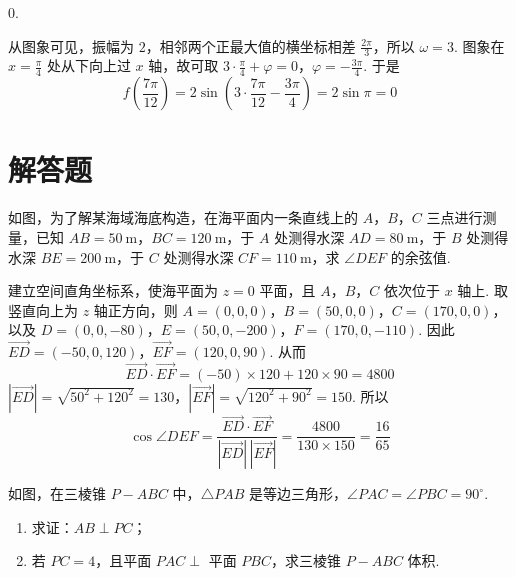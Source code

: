\begin{answer}
\(0\).
\end{answer}

\begin{solution}
从图象可见，振幅为 \(2\)，相邻两个正最大值的横坐标相差 \(\frac{2\pi}{3}\)，所以 \(\omega=3\). 图象在 \(x=\frac\pi4\) 处从下向上过 \(x\) 轴，故可取
\(3\cdot\frac\pi4+\varphi=0\)，\(\varphi=-\frac{3\pi}{4}\).
于是
\[
f\left(\frac{7\pi}{12}\right)
=2\sin\left(3\cdot\frac{7\pi}{12}-\frac{3\pi}{4}\right)
=2\sin\pi=0
\]
\end{solution}

\section{解答题}

\begin{problem}
如图，为了解某海域海底构造，在海平面内一条直线上的 \(A\)，\(B\)，\(C\) 三点进行测量，已知 \(AB = 50 \mathrm{~m}\)，\(BC = 120 \mathrm{~m}\)，于 \(A\) 处测得水深 \(AD = 80 \mathrm{~m}\)，于 \(B\) 处测得水深 \(BE = 200 \mathrm{~m}\)，于 \(C\) 处测得水深 \(CF = 110 \mathrm{~m}\)，求 \(\angle DEF\) 的余弦值.

\FloatBarrier
\end{problem}

\begin{solution}
建立空间直角坐标系，使海平面为 \(z=0\) 平面，且 \(A\)，\(B\)，\(C\) 依次位于 \(x\) 轴上. 取竖直向上为 \(z\) 轴正方向，则
\(A=(0,0,0)\)，\(B=(50,0,0)\)，\(C=(170,0,0)\)，
以及
\(D=(0,0,-80)\)，\(E=(50,0,-200)\)，\(F=(170,0,-110)\).
因此
\(\overrightarrow{ED}=(-50,0,120)\)，\(\overrightarrow{EF}=(120,0,90)\).
从而
\[
\overrightarrow{ED}\cdot\overrightarrow{EF}=(-50)\times120+120\times90=4800
\]
\(|\overrightarrow{ED}|=\sqrt{50^2+120^2}=130\)，\(|\overrightarrow{EF}|=\sqrt{120^2+90^2}=150\).
所以
\[
\cos\angle DEF=\frac{\overrightarrow{ED}\cdot\overrightarrow{EF}}{|\overrightarrow{ED}|\,|\overrightarrow{EF}|}=\frac{4800}{130\times150}=\frac{16}{65}
\]
\end{solution}

\begin{problem}
如图，在三棱锥 \(P - ABC\) 中，\(\triangle PAB\) 是等边三角形，\(\angle PAC = \angle PBC = 90^{\circ}\).

\begin{enumerate}
\item 求证：\(AB \perp PC\)；
\item 若 \(PC = 4\)，且平面 \(PAC \perp\) 平面 \(PBC\)，求三棱锥 \(P - ABC\) 体积.
\end{enumerate}

\end{problem}

